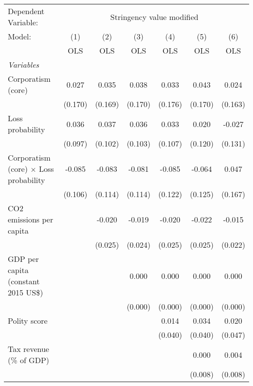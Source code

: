 
\begingroup
\centering
\begin{tabular}{lcccccc}
   \toprule
   Dependent Variable: & \multicolumn{6}{c}{Stringency value modified}\\
   Model:                                        & (1)     & (2)     & (3)     & (4)     & (5)     & (6)\\  
                                                 &  OLS    & OLS     & OLS     & OLS     & OLS     & OLS\\  
   \midrule
   \emph{Variables}\\
   Corporatism (core)                            & 0.027   & 0.035   & 0.038   & 0.033   & 0.043   & 0.024\\   
                                                 & (0.170) & (0.169) & (0.170) & (0.176) & (0.170) & (0.163)\\   
   Loss probability                              & 0.036   & 0.037   & 0.036   & 0.033   & 0.020   & -0.027\\   
                                                 & (0.097) & (0.102) & (0.103) & (0.107) & (0.120) & (0.131)\\   
   Corporatism (core) $\times$ Loss probability  & -0.085  & -0.083  & -0.081  & -0.085  & -0.064  & 0.047\\   
                                                 & (0.106) & (0.114) & (0.114) & (0.122) & (0.125) & (0.167)\\   
   CO2 emissions per capita                      &         & -0.020  & -0.019  & -0.020  & -0.022  & -0.015\\   
                                                 &         & (0.025) & (0.024) & (0.025) & (0.025) & (0.022)\\   
   GDP per capita (constant 2015 US\$)           &         &         & 0.000   & 0.000   & 0.000   & 0.000\\   
                                                 &         &         & (0.000) & (0.000) & (0.000) & (0.000)\\   
   Polity score                                  &         &         &         & 0.014   & 0.034   & 0.020\\   
                                                 &         &         &         & (0.040) & (0.040) & (0.047)\\   
   Tax revenue (\% of GDP)                       &         &         &         &         & 0.000   & 0.004\\   
                                                 &         &         &         &         & (0.008) & (0.008)\\   

\end{tabular}
